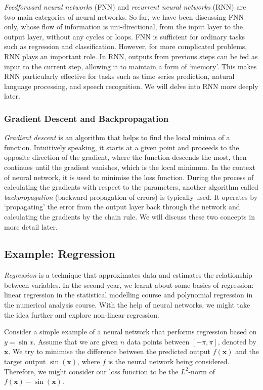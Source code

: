 \documentclass[a4paper,11pt, titlepage]{article}
\theoremstyle{definition}
\theoremstyle{plain}
\theoremstyle{remark}
\begin{document}
\textit{Feedforward neural networks} (FNN) and \textit{recurrent neural networks} (RNN) are two main categories of neural networks. So far, we have been discussing FNN only, whose flow of information is uni-directional, from the input layer to the output layer, without any cycles or loops. FNN is sufficient for ordinary tasks such as regression and classification. However, for more complicated problems, RNN plays an important role. In RNN, outputs from previous steps can be fed as input to the current step, allowing it to maintain a form of ‘memory’. This makes RNN particularly effective for tasks such as time series prediction, natural language processing, and speech recognition. We will delve into RNN more deeply later.

\subsubsection{Gradient Descent and Backpropagation}

\textit{Gradient descent} is an algorithm that helps to find the local minima of a function. Intuitively speaking, it starts at a given point and proceeds to the opposite direction of the gradient, where the function descends the most, then continues until the gradient vanishes, which is the local minimum. In the context of neural network, it is used to minimise the loss function. During the process of calculating the gradients with respect to the parameters, another algorithm called \textit{backpropagation} (backward propagation of errors) is typically used. It operates by ‘propagating’ the error from the output layer back through the network and calculating the gradients by the chain rule. We will discuss these two concepts in more detail later.

\subsection{Example: Regression}

\textit{Regression} is a technique that approximates data and estimates the relationship between variables. In the second year, we learnt about some basics of regression: linear regression in the statistical modelling course and polynomial regression in the numerical analysis course. With the help of neural networks, we might take the idea further and explore non-linear regression.

Consider a simple example of a neural network that performs regression based on $y = \sin x$. Assume that we are given $n$ data points between $[-\pi, \pi]$, denoted by $\mathbf{x}$. We try to minimise the difference between the predicted output $f(\mathbf{x})$ and the target output $\sin (\mathbf{x})$, where $f$ is the neural network being considered. Therefore, we might consider our loss function to be the $L^2$-norm of $f(\mathbf{x}) - \sin (\mathbf{x})$.
\end{document}

